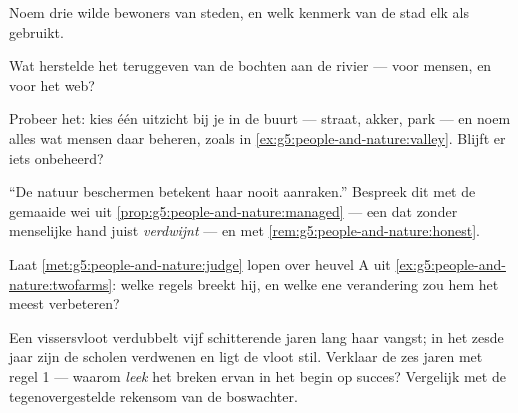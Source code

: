 \begin{exercise}[$\star$]\label{exo:g5:people-and-nature:6}
Noem drie wilde bewoners van steden, en welk kenmerk van de stad elk als
 gebruikt.
\end{exercise}

\begin{exercise}[$\star$]\label{exo:g5:people-and-nature:7}
Wat herstelde het teruggeven van de bochten aan de rivier --- voor
mensen, en voor het web?
\end{exercise}

\begin{exercise}[$\star$]\label{exo:g5:people-and-nature:8}
Probeer het: kies één uitzicht bij je in de buurt --- straat, akker,
park --- en noem alles wat mensen daar beheren, zoals in
\cref{ex:g5:people-and-nature:valley}. Blijft er iets onbeheerd?
\end{exercise}

\begin{exercise}[$\star\star$]\label{exo:g5:people-and-nature:9}
``De natuur beschermen betekent haar nooit aanraken.'' Bespreek dit met
de gemaaide wei uit \cref{prop:g5:people-and-nature:managed} --- een
 dat zonder menselijke hand juist \emph{verdwijnt} --- en met
\cref{rem:g5:people-and-nature:honest}.
\end{exercise}

\begin{exercise}[$\star\star$]\label{exo:g5:people-and-nature:10}
Laat \cref{met:g5:people-and-nature:judge} lopen over heuvel A uit
\cref{ex:g5:people-and-nature:twofarms}: welke regels breekt hij, en
welke ene verandering zou hem het meest verbeteren?
\end{exercise}

\begin{exercise}[$\star\star\star$]\label{exo:g5:people-and-nature:11}
Een vissersvloot verdubbelt vijf schitterende jaren lang haar vangst; in
het zesde jaar zijn de scholen verdwenen en ligt de vloot stil. Verklaar
de zes jaren met regel 1 --- waarom \emph{leek} het breken ervan in het
begin op succes? Vergelijk met de tegenovergestelde rekensom van de
boswachter.
\end{exercise}

